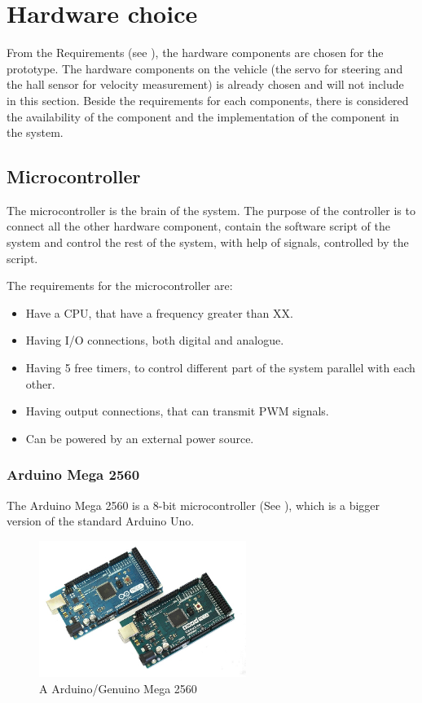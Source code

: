 \section{Hardware choice} \label{Hardwarechoice}
From the Requirements (see ), the hardware components are chosen for the prototype. The hardware components on the vehicle (the servo for steering and the hall sensor for velocity measurement) is already chosen and will not include in this section. Beside the requirements for each components, there is considered the availability of the component and the implementation of the component in the system. 


\subsection{Microcontroller}
The microcontroller is the brain of the system. The purpose of the controller is to connect all the other hardware component, contain the software script of the system and control the rest of the system, with help of signals, controlled by the script.

The requirements for the microcontroller are:
\begin{itemize}
\item Have a CPU, that have a frequency greater than XX. 
\item Having I/O connections, both digital and analogue.
\item Having 5 free timers, to control different part of the system parallel with each other.
\item Having output connections, that can transmit PWM signals.
\item Can be powered by an external power source.
\end{itemize} 

\subsubsection{Arduino Mega 2560}
The Arduino Mega 2560 is a 8-bit microcontroller (See ), which is a bigger version of the standard Arduino Uno. 

\begin{figure}[H]
	\centering
	\includegraphics[width=0.60\textwidth]{figures/ArdGenMega}
		\caption{A Arduino/Genuino Mega 2560} 
	\label{ArdGenMega}
\end{figure}


